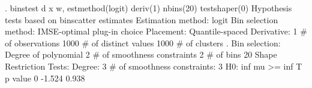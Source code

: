 . binstest d x w, estmethod(logit) deriv(1) nbins(20) testshaper(0)
{\smallskip}
Hypothesis tests based on binscatter estimates
Estimation method: logit
Bin selection method: IMSE-optimal plug-in choice
Placement: Quantile-spaced
Derivative: 1
{\smallskip}
\# of observations             {\VBAR}    1000
\# of distinct values          {\VBAR}    1000
\# of clusters                 {\VBAR}       .
Bin selection:                {\VBAR} 
         Degree of polynomial {\VBAR}       2
  \# of smoothness constraints {\VBAR}       2
                    \# of bins {\VBAR}      20
{\smallskip}
Shape Restriction Tests:
Degree: 3     \# of smoothness constraints: 3
{\smallskip}
H0: inf mu >=      {\VBAR} inf T             p value
         0         {\VBAR}  -1.524             0.938

